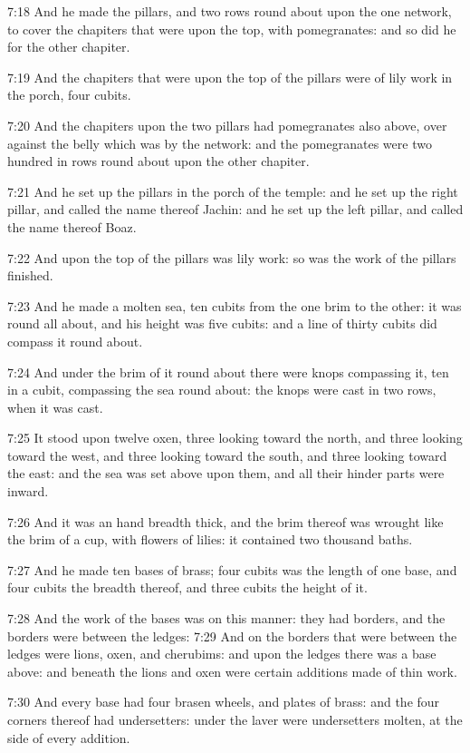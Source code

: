 7:18 And he made the pillars, and two rows round about upon the one network, to cover the chapiters that were upon the top, with pomegranates: and so did he for the other chapiter.

7:19 And the chapiters that were upon the top of the pillars were of lily work in the porch, four cubits.

7:20 And the chapiters upon the two pillars had pomegranates also above, over against the belly which was by the network: and the pomegranates were two hundred in rows round about upon the other chapiter.

7:21 And he set up the pillars in the porch of the temple: and he set up the right pillar, and called the name thereof Jachin: and he set up the left pillar, and called the name thereof Boaz.

7:22 And upon the top of the pillars was lily work: so was the work of the pillars finished.

7:23 And he made a molten sea, ten cubits from the one brim to the other: it was round all about, and his height was five cubits: and a line of thirty cubits did compass it round about.

7:24 And under the brim of it round about there were knops compassing it, ten in a cubit, compassing the sea round about: the knops were cast in two rows, when it was cast.

7:25 It stood upon twelve oxen, three looking toward the north, and three looking toward the west, and three looking toward the south, and three looking toward the east: and the sea was set above upon them, and all their hinder parts were inward.

7:26 And it was an hand breadth thick, and the brim thereof was wrought like the brim of a cup, with flowers of lilies: it contained two thousand baths.

7:27 And he made ten bases of brass; four cubits was the length of one base, and four cubits the breadth thereof, and three cubits the height of it.

7:28 And the work of the bases was on this manner: they had borders, and the borders were between the ledges: 7:29 And on the borders that were between the ledges were lions, oxen, and cherubims: and upon the ledges there was a base above: and beneath the lions and oxen were certain additions made of thin work.

7:30 And every base had four brasen wheels, and plates of brass: and the four corners thereof had undersetters: under the laver were undersetters molten, at the side of every addition.

